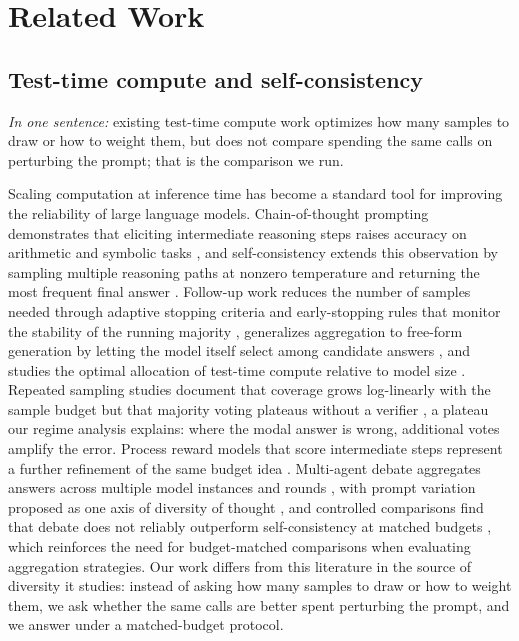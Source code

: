 \section{Related Work}
\label{sec:related}

\subsection{Test-time compute and self-consistency}

\emph{In one sentence:} existing test-time compute work optimizes how many samples to draw or how to weight them, but does not compare spending the same calls on perturbing the prompt; that is the comparison we run.

Scaling computation at inference time has become a standard tool for improving the reliability of large language models. Chain-of-thought prompting demonstrates that eliciting intermediate reasoning steps raises accuracy on arithmetic and symbolic tasks \citep{wei2022chain}, and self-consistency extends this observation by sampling multiple reasoning paths at nonzero temperature and returning the most frequent final answer \citep{wang2023selfconsistency}. Follow-up work reduces the number of samples needed through adaptive stopping criteria \citep{aggarwal2023lets} and early-stopping rules that monitor the stability of the running majority \citep{li2024escape}, generalizes aggregation to free-form generation by letting the model itself select among candidate answers \citep{chen2023universal}, and studies the optimal allocation of test-time compute relative to model size \citep{snell2024scaling}. Repeated sampling studies document that coverage grows log-linearly with the sample budget but that majority voting plateaus without a verifier \citep{brown2024large}, a plateau our regime analysis explains: where the modal answer is wrong, additional votes amplify the error. Process reward models that score intermediate steps represent a further refinement of the same budget idea \citep{lightman2023lets}. Multi-agent debate aggregates answers across multiple model instances and rounds \citep{du2023improving}, with prompt variation proposed as one axis of diversity of thought \citep{naik2023diversity}, and controlled comparisons find that debate does not reliably outperform self-consistency at matched budgets \citep{smit2024mad}, which reinforces the need for budget-matched comparisons when evaluating aggregation strategies. Our work differs from this literature in the source of diversity it studies: instead of asking how many samples to draw or how to weight them, we ask whether the same calls are better spent perturbing the prompt, and we answer under a matched-budget protocol.

